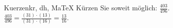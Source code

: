 \begin{MAufgabe}{Kuerzen}{kr, dh, MaTeX}
K\"urzen Sie soweit m\"oglich: $\frac{403}{496}$.\\ 
\ifLsg\MLoesung
\quad $\frac{403}{496}=\frac{(31)\cdot(13)}{(31)\cdot(16)}=\frac{13}{16}$.\else\relax\fi
 \end{MAufgabe}